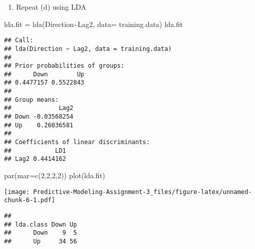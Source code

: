 \documentclass[
]{article}
\newenvironment{Shaded}{\begin{snugshade}}{\end{snugshade}}
\newcommand{\AttributeTok}[1]{\textcolor[rgb]{0.77,0.63,0.00}{#1}}
\newcommand{\DecValTok}[1]{\textcolor[rgb]{0.00,0.00,0.81}{#1}}
\newcommand{\FunctionTok}[1]{\textcolor[rgb]{0.00,0.00,0.00}{#1}}
\newcommand{\NormalTok}[1]{#1}
\newcommand{\OtherTok}[1]{\textcolor[rgb]{0.56,0.35,0.01}{#1}}
\newcommand{\SpecialCharTok}[1]{\textcolor[rgb]{0.00,0.00,0.00}{#1}}
\newcommand{\StringTok}[1]{\textcolor[rgb]{0.31,0.60,0.02}{#1}}
\providecommand{\tightlist}{%
  \setlength{\itemsep}{0pt}\setlength{\parskip}{0pt}}
\begin{document}
\begin{enumerate}
\def\labelenumi{(\alph{enumi})}
\setcounter{enumi}{4}
\tightlist
\item
  Repeat (d) using LDA
\end{enumerate}

\begin{Shaded}
\begin{Highlighting}[]
\NormalTok{lda.fit }\OtherTok{=} \FunctionTok{lda}\NormalTok{(Direction}\SpecialCharTok{\textasciitilde{}}\NormalTok{Lag2, }\AttributeTok{data=}\NormalTok{ training.data)}
\NormalTok{lda.fit}
\end{Highlighting}
\end{Shaded}

\begin{verbatim}
## Call:
## lda(Direction ~ Lag2, data = training.data)
## 
## Prior probabilities of groups:
##      Down        Up 
## 0.4477157 0.5522843 
## 
## Group means:
##             Lag2
## Down -0.03568254
## Up    0.26036581
## 
## Coefficients of linear discriminants:
##            LD1
## Lag2 0.4414162
\end{verbatim}

\begin{Shaded}
\begin{Highlighting}[]
\FunctionTok{par}\NormalTok{(}\AttributeTok{mar=}\FunctionTok{c}\NormalTok{(}\DecValTok{2}\NormalTok{,}\DecValTok{2}\NormalTok{,}\DecValTok{2}\NormalTok{,}\DecValTok{2}\NormalTok{))}
\FunctionTok{plot}\NormalTok{(lda.fit)}
\end{Highlighting}
\end{Shaded}

\texttt{[image: Predictive-Modeling-Assignment-3\_files/figure-latex/unnamed-chunk-6-1.pdf]}

\begin{Shaded}
\end{Shaded}

\begin{verbatim}
##          
## lda.class Down Up
##      Down    9  5
##      Up     34 56
\end{verbatim}
\end{document}
